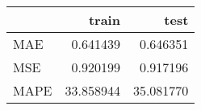 \begin{tabular}{lrr}
\toprule
{} &      train &       test \\
\midrule
MAE  &   0.641439 &   0.646351 \\
MSE  &   0.920199 &   0.917196 \\
MAPE &  33.858944 &  35.081770 \\
\bottomrule
\end{tabular}
